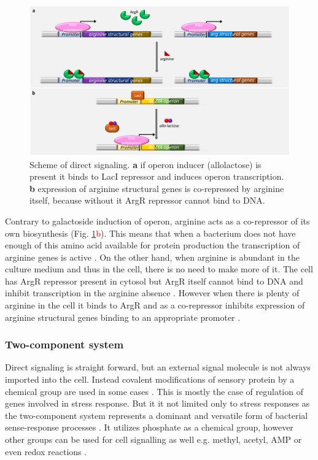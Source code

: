 \begin{figure}[ht]
  \centering
  \includegraphics[scale=0.27]{text/Pictures/DirectSignaling.png}
	\caption{Scheme of direct signaling. \textbf{a} if  operon inducer (allolactose) is present it binds to LacI repressor and induces  operon transcription. \textbf{b} expression of arginine structural genes is co-repressed by arginine itself, because without it ArgR repressor cannot bind to DNA.}
	\label{dir}
\end{figure}

Contrary to galactoside induction of  operon, arginine acts as a co-repressor of its own biosynthesis (Fig. \ref{dir}\textcolor{red}{b}).
This means that when a bacterium does not have enough of this amino acid available for protein production the transcription of arginine genes is active \cite{charlier2004biosynthesis, caldara2006arginine}.
On the other hand, when arginine is abundant in the culture medium and thus in the cell, there is no need to make more of it.
The cell has ArgR repressor present in cytosol but ArgR itself cannot bind to DNA and inhibit transcription in the arginine absence \cite{clark2005molecular, caldara2006arginine}.
However when there is plenty of arginine in the cell it binds to ArgR and as a co-repressor inhibits expression of arginine structural genes binding to an appropriate promoter \cite{charlier1992arginine, charlier2004biosynthesis, clark2005molecular}.

\subsubsection{Two-component system}
Direct signaling is straight forward, but an external signal molecule is not always imported into the cell.
Instead covalent modifications of sensory protein by a chemical group are used in some cases \cite{ninfa1986covalent, falke1997two}.
This is mostly the case of regulation of genes involved in stress response.
But it it not limited only to stress responses as the two-component system represents a dominant and versatile form of bacterial sense-response processes \cite{karniol2004hwe, kaczmarczyk2014complex, cui2018novel}.
It utilizes phosphate as a chemical group, however other groups can be used for cell signalling as well e.g. methyl, acetyl, AMP or even redox reactions \cite{kim2002oxyr, chaparro2010toxt, wang2010acetylation, you2013coordination}.

